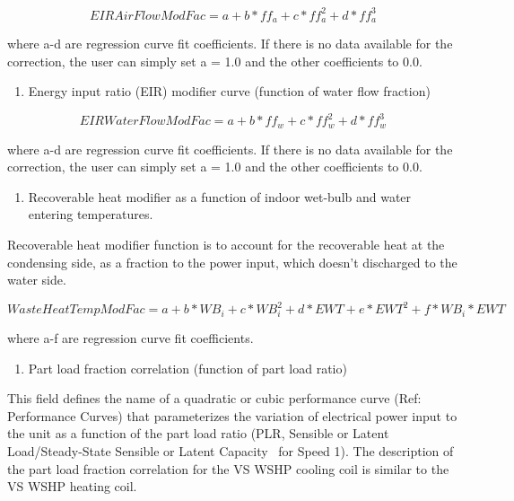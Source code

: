 \begin{equation}
EIRAirFlowModFac = a + b*f{f_a} + c*ff_a^2 + d*ff_a^3
\end{equation}

where a-d are regression curve fit coefficients.  If there is no data available for the correction, the user can simply set a = 1.0 and the other coefficients to 0.0.

\begin{enumerate}
\def\labelenumi{\arabic{enumi})}
\setcounter{enumi}{5}
\tightlist
\item
  Energy input ratio (EIR) modifier curve (function of water flow fraction)
\end{enumerate}

\begin{equation}
EIRWaterFlowModFac = a + b*f{f_w} + c*ff_w^2 + d*ff_w^3
\end{equation}

where a-d are regression curve fit coefficients.  If there is no data available for the correction, the user can simply set a = 1.0 and the other coefficients to 0.0.

\begin{enumerate}
\def\labelenumi{\arabic{enumi})}
\setcounter{enumi}{6}
\tightlist
\item
  Recoverable heat modifier as a function of indoor wet-bulb and water entering temperatures.
\end{enumerate}

Recoverable heat modifier function is to account for the recoverable heat at the condensing side, as a fraction to the power input, which doesn't discharged to the water side.

\begin{equation}
WasteHeatTempModFac = a + b*W{B_i} + c*WB_i^2 + d*EWT + e*EW{T^2} + f*W{B_i}*EWT
\end{equation}

where a-f are regression curve fit coefficients.

\begin{enumerate}
\def\labelenumi{\arabic{enumi})}
\setcounter{enumi}{7}
\tightlist
\item
  Part load fraction correlation (function of part load ratio)
\end{enumerate}

This field defines the name of a quadratic or cubic performance curve (Ref: Performance Curves) that parameterizes the variation of electrical power input to the unit as a function of the part load ratio (PLR, Sensible or Latent Load/Steady-State Sensible or Latent Capacity~ for Speed 1). The description of the part load fraction correlation for the VS WSHP cooling coil is similar to the VS WSHP heating coil.


